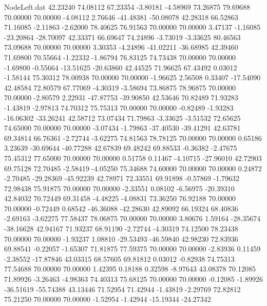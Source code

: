 \begin{filecontents}{NodeLeft.dat}
  42.23240   74.08112   67.23354    -3.80181   -4.58969   73.26875   79.69688   70.00000   70.00000   -4.08112    2.76646  -41.48381  -50.08078
  42.28318   66.52863   71.16085    -2.11863   -2.62000   78.40625   76.91563   70.00000   70.00000    3.47137   -1.16085  -23.20864  -28.70097
  42.33371   66.69647   74.24896    -3.73019   -3.33625   80.46563   73.09688   70.00000   70.00000    3.30353   -4.24896  -41.02211  -36.68985
  42.39460   71.69800   70.55664    -1.22332   -1.86794   76.83125   74.73438   70.00000   70.00000   -1.69800   -0.55664  -13.51625  -20.63860
  42.44525   71.96625   67.43492     0.03012   -1.58144   75.30312   78.00938   70.00000   70.00000   -1.96625    2.56508    0.33407  -17.54090
  42.48584   72.80579   67.77069    -4.30319   -3.58694   73.86875   78.96875   70.00000   70.00000   -2.80579    2.22931  -47.87753  -39.90850
  42.53646   70.82489   71.93283    -1.43819   -2.97813   74.70312   75.75313   70.00000   70.00000   -0.82489   -1.93283  -16.06302  -33.26241
  42.58712   73.07434   71.79863    -3.33625   -3.51532   72.65625   74.65000   70.00000   70.00000   -3.07434   -1.79863  -37.40530  -39.41291
  42.63781   69.34814   66.76361    -2.72744   -3.62275   74.81563   78.78125   70.00000   70.00000    0.65186    3.23639  -30.69644  -40.77288
  42.67839   69.48242   69.88533    -0.36382   -2.47675   75.45312   77.65000   70.00000   70.00000    0.51758    0.11467   -4.10715  -27.96010
  42.72903   69.75128   72.70485    -2.58419   -4.05250   75.34688   74.60000   70.00000   70.00000    0.24872   -2.70485  -29.28369  -45.92239
  42.78971   72.33551   69.91898    -0.57869   -1.79632   72.98438   75.91875   70.00000   70.00000   -2.33551    0.08102   -6.56975  -20.39310
  42.84032   70.72449   69.31458    -4.48225   -4.08831   73.36250   76.92188   70.00000   70.00000   -0.72449    0.68542  -46.36088  -42.28630
  42.89092   66.19324   68.40836    -2.69163   -3.62275   77.58437   78.06875   70.00000   70.00000    3.80676    1.59164  -28.35674  -38.16628
  42.94167   71.93237   68.91190    -2.72744   -4.30319   74.12500   78.23438   70.00000   70.00000   -1.93237    1.08810  -29.53493  -46.59840
  42.98230   72.83936   69.88541    -0.22057   -1.65307   71.81875   77.59375   70.00000   70.00000   -2.83936    0.11459   -2.38552  -17.87846
  43.03315   68.57605   69.81812     0.03012   -0.82938   74.75313   77.54688   70.00000   70.00000    1.42395    0.18188    0.32598   -8.97643
  43.08378   70.12085   71.89926    -3.26463   -4.98363   74.40313   75.68125   70.00000   70.00000   -0.12085   -1.89926  -36.51619  -55.74388
  43.13446   71.52954   71.42944    -1.43819   -2.29769   72.82812   75.21250   70.00000   70.00000   -1.52954   -1.42944  -15.19344  -24.27342

\end{filecontents}
